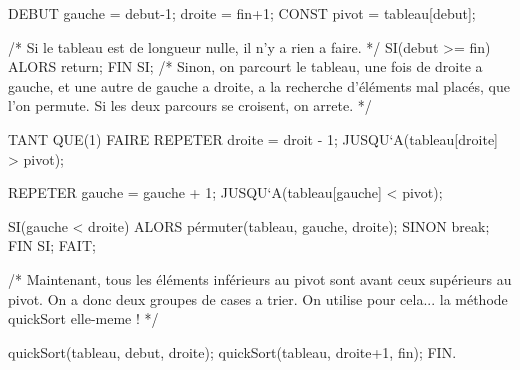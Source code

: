 \documentclass[12pt]{article}
\begin{document}
\begin{enumerate}
\begin{sql}
	DEBUT
		gauche = debut-1;
		droite = fin+1;
		CONST pivot = tableau[debut];

		/* Si le tableau est de longueur nulle, il n'y a rien a faire. */
		SI(debut >= fin)
			ALORS return;
		FIN SI;
		/* Sinon, on parcourt le tableau, une fois de droite a gauche, et une
	   autre de gauche a droite, a la recherche d'éléments mal placés,
	   que l'on permute. Si les deux parcours se croisent, on arrete. */
	
		TANT QUE(1)
		FAIRE
			REPETER 
			droite = droit - 1; 
			JUSQU`A(tableau[droite] > pivot);
							
			REPETER
			gauche = gauche + 1; 
			JUSQU`A(tableau[gauche] < pivot);

			SI(gauche < droite)
				ALORS pérmuter(tableau, gauche, droite);
				SINON break;
			FIN SI;
		FAIT;

		/* Maintenant, tous les éléments inférieurs au pivot sont avant ceux
	   supérieurs au pivot. On a donc deux groupes de cases a trier. On utilise
	   pour cela... la méthode quickSort elle-meme ! */
					   
		quickSort(tableau, debut, droite);
		quickSort(tableau, droite+1, fin);
	FIN.
	\end{sql}
\end{enumerate}
\end{document}
